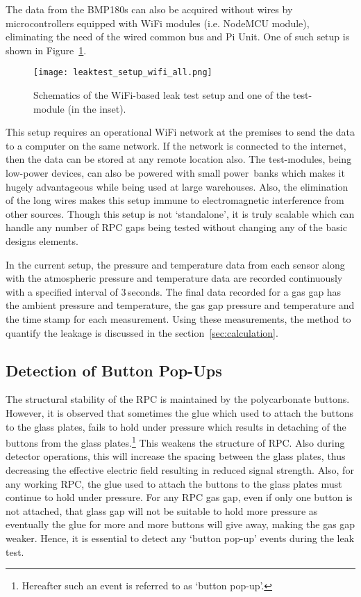 The data from the BMP180s can also be acquired without wires by
microcontrollers equipped with WiFi modules (i.e. NodeMCU
module\cite{nodemcu2015}), eliminating the need of the wired common bus and
Pi Unit. One of such setup is shown in Figure~\ref{fig:leakwifi}. 
\begin{figure}
  \centering
  \texttt{[image: leaktest\_setup\_wifi\_all.png]}
  \caption{Schematics of the WiFi-based leak test setup and one of the
    test-module (in the inset).}
  \label{fig:leakwifi}
\end{figure}
This setup requires an operational WiFi network at the premises to send the
data to a computer on the same network. If the network is connected to the
internet, then the data can be stored at any remote location also. The
test-modules, being low-power devices, can also be powered with small
power~banks which makes it hugely advantageous while being used at large
warehouses. Also, the elimination of the long wires makes this setup immune
to electromagnetic interference from other sources. Though this setup is not
`standalone', it is truly scalable which can handle any number of RPC gaps
being tested without changing any of the basic designs elements.

In the current setup, the pressure and temperature data from each sensor along
with the atmospheric pressure and temperature data are recorded continuously
with a specified interval of $3$\,seconds. The final data recorded for a gas
gap has the ambient pressure and temperature, the gas gap pressure and
temperature and the time stamp for each measurement. Using these measurements,
the method to quantify the leakage is discussed in the
section~\ref{sec:calculation}.

\subsection{Detection of Button Pop-Ups}\label{sec:button}
The structural stability of the RPC is maintained by the polycarbonate buttons.
However, it is observed that sometimes the glue which used to attach the
buttons to the glass plates, fails to hold under pressure which results in
detaching of the buttons from the glass plates.\footnote{Hereafter such an event is referred to as `button pop-up'.}
This weakens the structure of RPC. Also during detector operations, this will
increase the spacing between the glass plates, thus decreasing the effective
electric field resulting in reduced signal strength. Also, for any working RPC,
the glue used to attach the buttons to the glass plates must continue to hold
under pressure. For any RPC gas gap, even if only one button is not attached,
that glass gap will not be suitable to hold more pressure as eventually the
glue for more and more buttons will give away, making the gas gap weaker.
Hence, it is essential to detect any `button pop-up' events during the leak
test.

